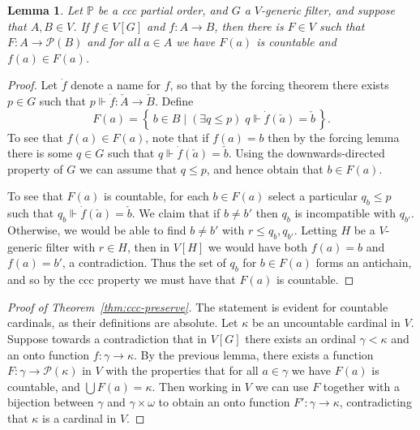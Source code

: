 \documentclass[11pt,oneside,a4paper]{amsbook}
\newcommand{\set}[1]{\left\{\,#1\,\right\}}
\newcommand{\PP}{\mathbb P}
\newcommand{\forces}{\Vdash}
\theoremstyle{definition}
\theoremstyle{plain}
\newtheorem{lemma}[theorem]{Lemma}
\theoremstyle{definition}
\theoremstyle{remark}
\numberwithin{equation}{section}
\numberwithin{figure}{section}
\begin{document}
\begin{lemma}
  Let $\PP$ be a ccc partial order, and $G$ a $V$-generic filter, and suppose that $A,B\in V$. If $f\in V[G]$ and $f\colon A\to B$, then there is $F\in V$ such that $F\colon A\to\mathcal P(B)$ and for all $a\in A$ we have $F(a)$ is countable and $f(a)\in F(a)$.
\end{lemma}

\begin{proof}
  Let $\dot f$ denote a name for $f$, so that by the forcing theorem there exists $p\in G$ such that $p\forces \dot f\colon\check A\to\check B$. Define
  \[F(a)=\set{b\in B\mid(\exists q\leq p)\;q\forces\dot f(\check a)=\check b}\text{.}
  \]
  To see that $f(a)\in F(a)$, note that if $f(a)=b$ then by the forcing lemma there is some $q\in G$ such that $q\forces\dot f(\check a)=\check b$. Using the downwards-directed property of $G$ we can assume that $q\leq p$, and hence obtain that $b\in F(a)$.

  To see that $F(a)$ is countable, for each $b\in F(a)$ select a particular $q_b\leq p$ such that $q_b\forces\dot f(\check a)=\check b$. We claim that if $b\neq b'$ then $q_b$ is incompatible with $q_{b'}$. Otherwise, we would be able to find $b\neq b'$ with $r\leq q_b,q_{b'}$. Letting $H$ be a $V$-generic filter with $r\in H$, then in $V[H]$ we would have both $f(a)=b$ and $f(a)=b'$, a contradiction. Thus the set of $q_b$ for $b\in F(a)$ forms an antichain, and so by the ccc property we must have that $F(a)$ is countable.
\end{proof}

\begin{proof}[Proof of Theorem~\ref{thm:ccc-preserve}]
  The statement is evident for countable cardinals, as their definitions are absolute. Let $\kappa$ be an uncountable cardinal in $V$. Suppose towards a contradiction that in $V[G]$ there exists an ordinal $\gamma<\kappa$ and an onto function $f\colon\gamma\to\kappa$. By the previous lemma, there exists a function $F\colon\gamma\to\mathcal P(\kappa)$ in $V$ with the properties that for all $a\in\gamma$ we have $F(a)$ is countable, and $\bigcup F(a)=\kappa$. Then working in $V$ we can use $F$ together with a bijection between $\gamma$ and $\gamma\times\omega$ to obtain an onto function $F'\colon\gamma\to\kappa$, contradicting that $\kappa$ is a cardinal in $V$.
\end{proof}
\end{document}
